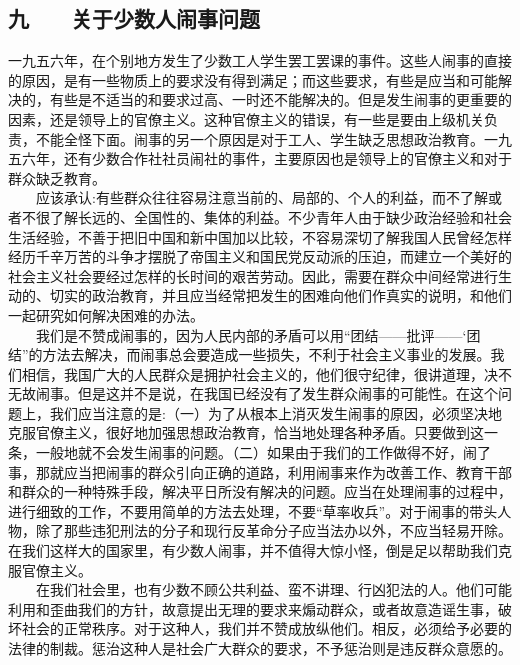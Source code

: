 \documentclass[cn,11pt,chinese]{elegantbook}
\def\myformat#1{\hfil\hfil #1}
\begin{document}
\subsection*{\myformat{九　　关于少数人闹事问题}}
一九五六年，在个别地方发生了少数工人学生罢工罢课的事件。这些人闹事的直接的原因，是有一些物质上的要求没有得到满足；而这些要求，有些是应当和可能解决的，有些是不适当的和要求过高、一时还不能解决的。但是发生闹事的更重要的因素，还是领导上的官僚主义。这种官僚主义的错误，有一些是要由上级机关负责，不能全怪下面。闹事的另一个原因是对于工人、学生缺乏思想政治教育。一九五六年，还有少数合作社社员闹社的事件，主要原因也是领导上的官僚主义和对于群众缺乏教育。\\
　　应该承认:有些群众往往容易注意当前的、局部的、个人的利益，而不了解或者不很了解长远的、全国性的、集体的利益。不少青年人由于缺少政治经验和社会生活经验，不善于把旧中国和新中国加以比较，不容易深切了解我国人民曾经怎样经历千辛万苦的斗争才摆脱了帝国主义和国民党反动派的压迫，而建立一个美好的社会主义社会要经过怎样的长时间的艰苦劳动。因此，需要在群众中间经常进行生动的、切实的政治教育，并且应当经常把发生的困难向他们作真实的说明，和他们一起研究如何解决困难的办法。\\
　　我们是不赞成闹事的，因为人民内部的矛盾可以用“团结——批评——‘团结”的方法去解决，而闹事总会要造成一些损失，不利于社会主义事业的发展。我们相信，我国广大的人民群众是拥护社会主义的，他们很守纪律，很讲道理，决不无故闹事。但是这并不是说，在我国已经没有了发生群众闹事的可能性。在这个问题上，我们应当注意的是:（一）为了从根本上消灭发生闹事的原因，必须坚决地克服官僚主义，很好地加强思想政治教育，恰当地处理各种矛盾。只要做到这一条，一般地就不会发生闹事的问题。（二）如果由于我们的工作做得不好，闹了事，那就应当把闹事的群众引向正确的道路，利用闹事来作为改善工作、教育干部和群众的一种特殊手段，解决平日所没有解决的问题。应当在处理闹事的过程中，进行细致的工作，不要用简单的方法去处理，不要“草率收兵”。对于闹事的带头人物，除了那些违犯刑法的分子和现行反革命分子应当法办以外，不应当轻易开除。在我们这样大的国家里，有少数人闹事，并不值得大惊小怪，倒是足以帮助我们克服官僚主义。\\
　　在我们社会里，也有少数不顾公共利益、蛮不讲理、行凶犯法的人。他们可能利用和歪曲我们的方针，故意提出无理的要求来煽动群众，或者故意造谣生事，破坏社会的正常秩序。对于这种人，我们并不赞成放纵他们。相反，必须给予必要的法律的制裁。惩治这种人是社会广大群众的要求，不予惩治则是违反群众意愿的。\\
\end{document}
